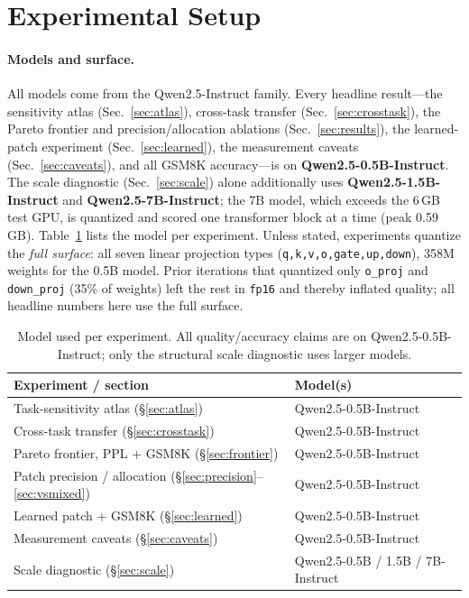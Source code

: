 \documentclass[manuscript, screen, review]{jair}
\newcommand{\code}[1]{\texttt{#1}}
\begin{document}
\section{Experimental Setup}
\label{sec:setup}

\paragraph{Models and surface.} All models come from the Qwen2.5-Instruct
family. Every headline result---the sensitivity atlas
(Sec.~\ref{sec:atlas}), cross-task transfer
(Sec.~\ref{sec:crosstask}), the Pareto frontier and precision/allocation
ablations (Sec.~\ref{sec:results}), the learned-patch experiment
(Sec.~\ref{sec:learned}), the measurement caveats (Sec.~\ref{sec:caveats}), and
all GSM8K accuracy---is on \textbf{Qwen2.5-0.5B-Instruct}. The scale diagnostic
(Sec.~\ref{sec:scale}) alone additionally uses \textbf{Qwen2.5-1.5B-Instruct}
and \textbf{Qwen2.5-7B-Instruct}; the 7B model, which exceeds the 6\,GB test
GPU, is quantized and scored one transformer block at a time (peak 0.59\,GB).
Table~\ref{tab:models} lists the model per experiment. Unless stated,
experiments quantize the \emph{full surface}: all seven linear projection types
(\code{q,k,v,o,gate,up,down}), 358M weights for the 0.5B model. Prior iterations
that quantized only \code{o\_proj} and \code{down\_proj} (35\% of weights) left
the rest in \code{fp16} and thereby inflated quality; all headline numbers here
use the full surface.

\begin{table}[t]
\centering
\caption{Model used per experiment. All quality/accuracy claims are on
Qwen2.5-0.5B-Instruct; only the structural scale diagnostic uses larger models.}
\label{tab:models}
\begin{tabular}{ll}
\toprule
Experiment / section & Model(s) \\
\midrule
Task-sensitivity atlas (\S\ref{sec:atlas}) & Qwen2.5-0.5B-Instruct \\
Cross-task transfer (\S\ref{sec:crosstask}) & Qwen2.5-0.5B-Instruct \\
Pareto frontier, PPL + GSM8K (\S\ref{sec:frontier}) & Qwen2.5-0.5B-Instruct \\
Patch precision / allocation (\S\ref{sec:precision}--\ref{sec:vsmixed}) & Qwen2.5-0.5B-Instruct \\
Learned patch + GSM8K (\S\ref{sec:learned}) & Qwen2.5-0.5B-Instruct \\
Measurement caveats (\S\ref{sec:caveats}) & Qwen2.5-0.5B-Instruct \\
Scale diagnostic (\S\ref{sec:scale}) & Qwen2.5-0.5B / 1.5B / 7B-Instruct \\
\bottomrule
\end{tabular}
\end{table}
\end{document}

